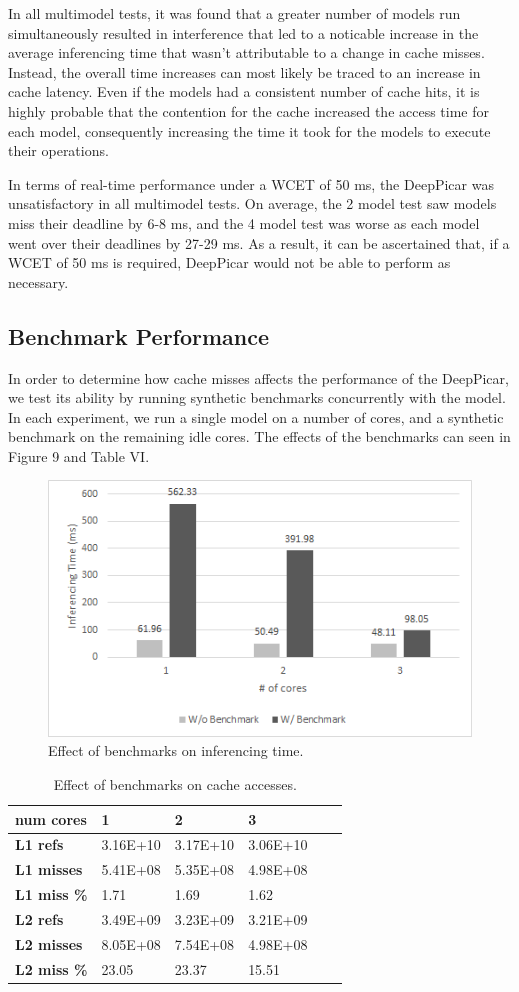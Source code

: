 In all multimodel tests, it was found that a greater number of models run simultaneously resulted in 
interference that led to a noticable increase in the average inferencing time that wasn't 
attributable to a change in cache misses. Instead, the overall time increases can most likely be 
traced to an increase in cache latency. Even if the models had a consistent number of cache hits, it 
is highly probable that the contention for the cache increased the access time for each model, 
consequently increasing the time it took for the models to execute their operations.

In terms of real-time performance under a WCET of 50 ms, the DeepPicar was unsatisfactory in all 
multimodel tests. On average, the 2 model test saw models miss their deadline by 6-8 ms, and the 4 
model test was worse as each model went over their deadlines by 27-29 ms. As a result, it can be 
ascertained that, if a WCET of 50 ms is required, DeepPicar would not be able to perform as necessary.

\subsection{Benchmark Performance}
In order to determine how cache misses affects the performance of the DeepPicar, we test its ability by 
running synthetic benchmarks concurrently with the model. In each experiment, we run a single model on a 
number of cores, and a synthetic benchmark on the remaining idle cores. The effects of the benchmarks can
seen in Figure 9 and Table VI.

\begin{figure}[h]
  \centering
  \includegraphics[width=.5\textwidth]{figs/BenchmarkChart}
  \caption{ Effect of benchmarks on inferencing time. }
\end{figure}

\begin{table}[h]
\centering
  \begin{tabular} {| l | l | l | l | l | l |}
  \hline
  \textbf{num cores} & 1 & 2 & 3 \\ \hline
  \textbf{L1 refs} & 3.16E+10 & 3.17E+10 & 3.06E+10 \\ \hline
  \textbf{L1 misses} & 5.41E+08 & 5.35E+08 & 4.98E+08 \\ \hline
  \textbf{L1 miss \%} & 1.71 & 1.69 & 1.62 \\ \hline
  \textbf{L2 refs} & 3.49E+09 & 3.23E+09 & 3.21E+09 \\ \hline
  \textbf{L2 misses} & 8.05E+08 & 7.54E+08 & 4.98E+08 \\ \hline
  \textbf{L2 miss \%} & 23.05 & 23.37 & 15.51 \\ 
  \hline
  \end{tabular}
  \caption{ Effect of benchmarks on cache accesses. }
\end{table}


